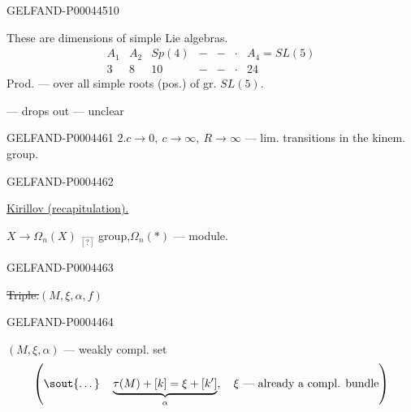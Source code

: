 \begin{GelfandAdjacentEvidence}{GELFAND-P000445}{10}


These are dimensions of simple Lie algebras.
\[
\begin{array}{ccccccc}
A_1&A_2&Sp(4)&-&-&\cdot&A_4=SL(5)\\
3&8&10&-&-&\cdot&24
\end{array}
\]
Prod. — over all simple roots (pos.) of gr. $SL(5)$.
\end{GelfandAdjacentEvidence}


 — drops out — unclear


\begin{GelfandAdjacentEvidence}{GELFAND-P000446}{1}
$2.$\quad $c\to0,\ c\to\infty,\ R\to\infty$ — lim. transitions in the kinem. group.
\end{GelfandAdjacentEvidence}
\begin{GelfandAdjacentEvidence}{GELFAND-P000446}{2}



\underline{Kirillov (recapitulation).}

$X\longrightarrow\Omega_n(X)\;\underset{[?]}{\text{—}}$
group,\quad $\Omega_n(*)$ — module.
\end{GelfandAdjacentEvidence}
\begin{GelfandAdjacentEvidence}{GELFAND-P000446}{3}


\sout{Triple.}\qquad $(M,\xi,\alpha,f)$
\end{GelfandAdjacentEvidence}
\begin{GelfandAdjacentEvidence}{GELFAND-P000446}{4}


$(M,\xi,\alpha)$ — weakly compl. set
\[
\left(
\text{\sout{\ldots}}\quad
\underbrace{\tau(M)+[k]=\xi+[k']}_{\alpha},
\quad \xi\text{ — already a compl. bundle}
\right)
\]
\end{GelfandAdjacentEvidence}
